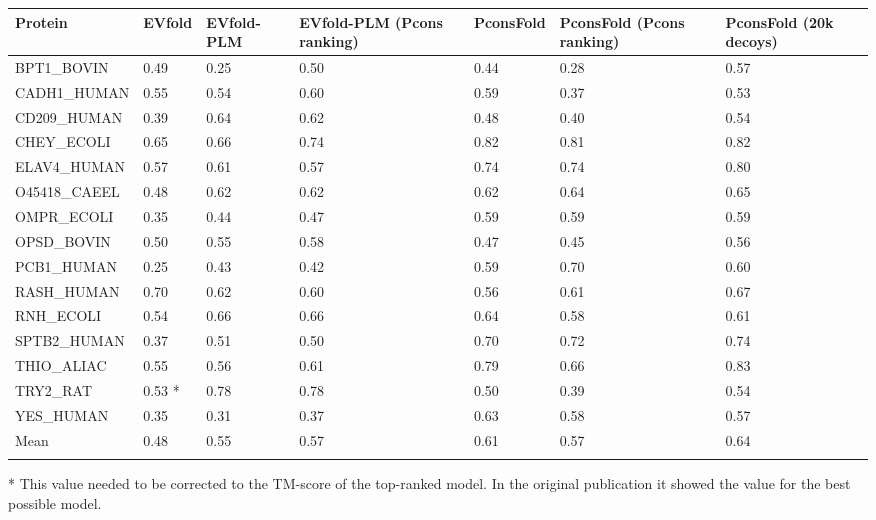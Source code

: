 \documentclass{bioinfo}
\begin{document}
\begin{table}[!t]
{\begin{tabular}{lllllll}\toprule
Protein & EVfold & EVfold-PLM & EVfold-PLM (Pcons ranking) & PconsFold & PconsFold (Pcons ranking) & PconsFold (20k decoys)\\\midrule
BPT1\_BOVIN & 0.49 & 0.25 & 0.50 & 0.44 & 0.28 & 0.57 \\
CADH1\_HUMAN & 0.55 & 0.54 & 0.60 & 0.59 & 0.37 & 0.53 \\
CD209\_HUMAN & 0.39 & 0.64 & 0.62 & 0.48 & 0.40 & 0.54 \\
CHEY\_ECOLI & 0.65 & 0.66 & 0.74 & 0.82 &  0.81 & 0.82 \\
ELAV4\_HUMAN & 0.57 & 0.61 & 0.57 & 0.74 & 0.74 & 0.80 \\
O45418\_CAEEL & 0.48 & 0.62 & 0.62 & 0.62 & 0.64 & 0.65 \\
OMPR\_ECOLI & 0.35 & 0.44 & 0.47 & 0.59 & 0.59 & 0.59 \\
OPSD\_BOVIN & 0.50 & 0.55 & 0.58 & 0.47 & 0.45 & 0.56 \\
PCB1\_HUMAN & 0.25 & 0.43 & 0.42 & 0.59 & 0.70 & 0.60 \\
RASH\_HUMAN & 0.70 & 0.62 & 0.60 & 0.56 & 0.61& 0.67 \\
RNH\_ECOLI & 0.54 & 0.66 & 0.66 & 0.64 & 0.58& 0.61 \\
SPTB2\_HUMAN & 0.37 & 0.51 & 0.50 & 0.70 & 0.72& 0.74 \\
THIO\_ALIAC & 0.55 & 0.56 & 0.61 & 0.79 & 0.66& 0.83 \\
TRY2\_RAT & 0.53 * & 0.78 & 0.78 & 0.50 & 0.39 & 0.54 \\
YES\_HUMAN & 0.35 & 0.31 & 0.37 & 0.63 & 0.58& 0.57 \\ \midrule
Mean & 0.48 & 0.55 & 0.57 & 0.61 & 0.57& 0.64 \\ \botrule
\end{tabular}}{* This value needed to be corrected to the TM-score of the top-ranked model. In the original publication it showed the value for the best possible model.}
\end{table}
\end{document}
